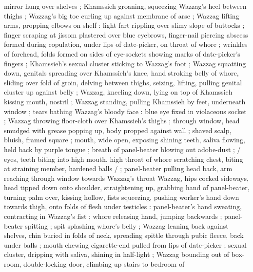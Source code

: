 mirror hung over shelves ; Khamssieh groaning, squeezing Wazzag's heel between thighs ; Wazzag's big
toe curling up against membrane of arse ; Wazzag lifting arms, propping elbows on shelf : light fart
rippling over slimy slope of buttocks ; finger scraping at jissom plastered over blue eyebrows,
finger-nail piercing abscess formed during copulation, under lips of date-picker, on throat of whore
; wrinkles of forehead, folds formed on sides of eye-sockets showing marks of date-picker's fingers
; Khamssieh's sexual cluster sticking to Wazzag's foot ; Wazzag squatting down, genitals spreading
over Khamssieh's knee, hand stroking belly of whore, sliding over fold of groin, delving between
thighs, seizing, lifting, pulling genital cluster up against belly ; Wazzag, kneeling down, lying on
top of Khamssieh kissing mouth, nostril  ; Wazzag standing, pulling Khamssieh by feet, underneath window ;
tears bathing Wazzag's bloody face : blue eye fixed in violaceous socket ; Wazzag throwing
floor-cloth over Khamssieh's thighs ; through window, head smudged with grease popping up, body
propped against wall ; shaved scalp, bluish, framed 
square ; mouth, wide open, exposing shining teeth, saliva flowing, held back by purple tongue
 ; breath of panel-beater blowing out adobe-dust ;
{\fourdots} {\slash} eyes, teeth biting into high mouth, high throat of whore scratching chest,
biting at straining member, hardened balls {\slash} {\fourdots} ; panel-beater pulling head back,
arm reaching through window towards Wazzag's throat Wazzag, hips cocked sideways, head tipped down
onto shoulder, straightening up, grabbing hand of panel-beater, turning palm over, kissing hollow,
fists squeezing, pushing worker's hand down towards thigh, onto folds of flesh under testicles :
panel-beater's hand sweating, contracting in Wazzag's fist ; whore releasing hand, jumping backwards
; panel-beater spitting ; spit splashing whore's belly ; Wazzag leaning back against shelves, chin
buried in folds of neck, spreading spittle through pubic fleece, back under balls ; mouth chewing
cigarette-end pulled from lips of date-picker ; sexual cluster, dripping with saliva, shining in
half-light ; Wazzag bounding out of box-room, double-locking door, climbing up stairs to bedroom of
